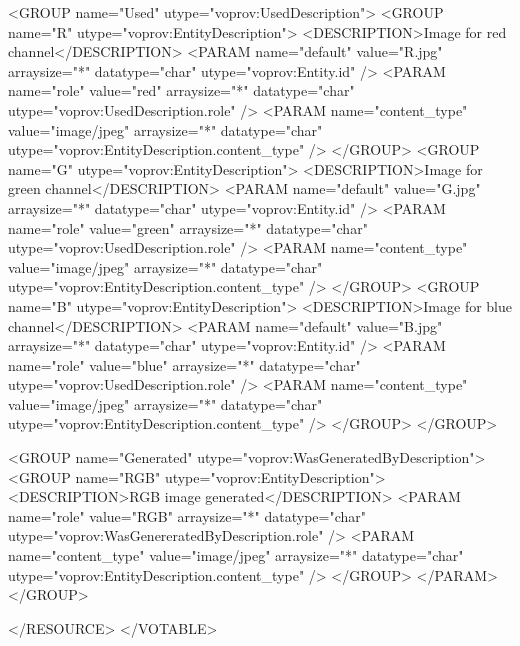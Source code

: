 \begin{verbnobox}[\scriptsize]
    <GROUP name="Used" utype="voprov:UsedDescription">
      <GROUP name="R" utype="voprov:EntityDescription">
        <DESCRIPTION>Image for red channel</DESCRIPTION>
        <PARAM name="default" value="R.jpg" arraysize="*" datatype="char" 
            utype="voprov:Entity.id" />
        <PARAM name="role" value="red" arraysize="*" datatype="char" 
            utype="voprov:UsedDescription.role" />
        <PARAM name="content_type" value="image/jpeg" arraysize="*" datatype="char" 
            utype="voprov:EntityDescription.content_type" />
      </GROUP>
      <GROUP name="G" utype="voprov:EntityDescription">
        <DESCRIPTION>Image for green channel</DESCRIPTION>
        <PARAM name="default" value="G.jpg" arraysize="*" datatype="char" 
            utype="voprov:Entity.id" />
        <PARAM name="role" value="green" arraysize="*" datatype="char" 
            utype="voprov:UsedDescription.role" />
        <PARAM name="content_type" value="image/jpeg" arraysize="*" datatype="char" 
           utype="voprov:EntityDescription.content_type" />
      </GROUP>
      <GROUP name="B" utype="voprov:EntityDescription">
        <DESCRIPTION>Image for blue channel</DESCRIPTION>
        <PARAM name="default" value="B.jpg" arraysize="*" datatype="char" 
            utype="voprov:Entity.id" />
        <PARAM name="role" value="blue" arraysize="*" datatype="char" 
            utype="voprov:UsedDescription.role" />
        <PARAM name="content_type" value="image/jpeg" arraysize="*" datatype="char" 
            utype="voprov:EntityDescription.content_type" />
      </GROUP>
    </GROUP>
    
    <GROUP name="Generated" utype="voprov:WasGeneratedByDescription">
      <GROUP name="RGB" utype="voprov:EntityDescription">
        <DESCRIPTION>RGB image generated</DESCRIPTION>
        <PARAM name="role" value="RGB" arraysize="*" datatype="char" 
            utype="voprov:WasGenereratedByDescription.role" />
        <PARAM name="content_type" value="image/jpeg" arraysize="*" datatype="char" 
            utype="voprov:EntityDescription.content_type" />
      </GROUP>
      </PARAM>
    </GROUP>
    
  </RESOURCE>
</VOTABLE>

\end{verbnobox}
